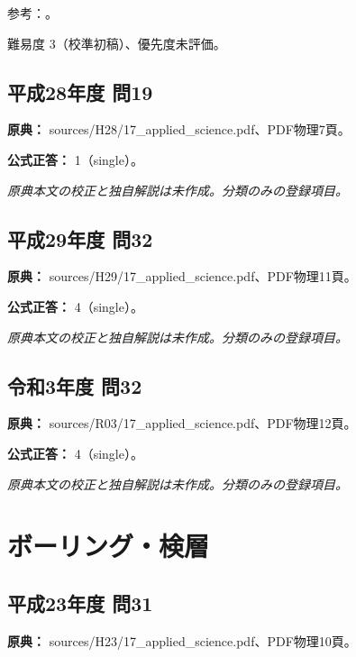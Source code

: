 \par 参考：\cite{ochi_csamt_saijo,gsi_gravity_definitions}。

\par 難易度 3（校準初稿）、優先度未評価。

\subsection{平成28年度 問19}
\label{q:h28-reg-applied-19}

\noindent\textbf{原典：} sources/H28/17\_applied\_science.pdf、PDF物理7頁。

\textbf{公式正答：} 1（single）。

\par\textit{原典本文の校正と独自解説は未作成。分類のみの登録項目。}

\subsection{平成29年度 問32}
\label{q:h29-reg-applied-32}

\noindent\textbf{原典：} sources/H29/17\_applied\_science.pdf、PDF物理11頁。

\textbf{公式正答：} 4（single）。

\par\textit{原典本文の校正と独自解説は未作成。分類のみの登録項目。}

\subsection{令和3年度 問32}
\label{q:r03-reg-applied-32}

\noindent\textbf{原典：} sources/R03/17\_applied\_science.pdf、PDF物理12頁。

\textbf{公式正答：} 4（single）。

\par\textit{原典本文の校正と独自解説は未作成。分類のみの登録項目。}

\section{ボーリング・検層}

\subsection{平成23年度 問31}
\label{q:h23-reg-applied-31}

\noindent\textbf{原典：} sources/H23/17\_applied\_science.pdf、PDF物理10頁。

